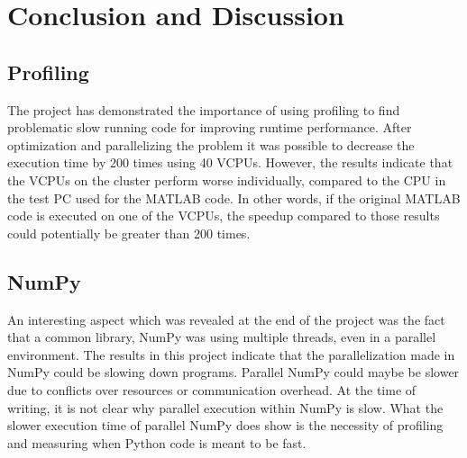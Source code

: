 \documentclass[12pt, a4paper]{article}
\begin{document}

\section{Conclusion and Discussion}

\subsection{Profiling}

The project has demonstrated the importance of using profiling to find problematic slow running code for improving runtime performance.
After optimization and parallelizing the problem it was possible to decrease the execution time by 200 times using 40 VCPUs.
However, the results indicate that the VCPUs on the cluster perform worse individually, compared to the CPU in the test PC used for the MATLAB code.
In other words, if the original MATLAB code is executed on one of the VCPUs, the speedup compared to those results could potentially be greater than 200 times.

\subsection{NumPy}

An interesting aspect which was revealed at the end of the project was the fact that a common library, NumPy was using multiple threads, even in a parallel environment.
The results in this project indicate that the parallelization made in NumPy could be slowing down programs.
Parallel NumPy could maybe be slower due to conflicts over resources or communication overhead.
At the time of writing, it is not clear why parallel execution within NumPy is slow.
What the slower execution time of parallel NumPy does show is the necessity of profiling and measuring when Python code is meant to be fast.
\end{document}
